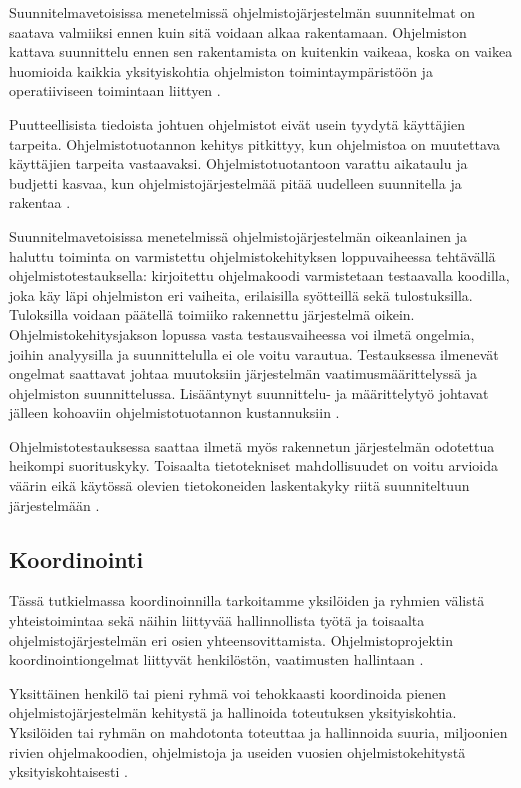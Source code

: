 \documentclass[finnish]{tktltiki2}
\theoremstyle{definition}
\theoremstyle{remark}
\begin{document}
Suunnitelmavetoisissa menetelmissä ohjelmistojärjestelmän suunnitelmat on saatava valmiiksi ennen kuin sitä voidaan alkaa rakentamaan. Ohjelmiston kattava suunnittelu ennen sen rakentamista on kuitenkin vaikeaa, koska on vaikea huomioida kaikkia yksityiskohtia ohjelmiston toimintaympäristöön ja operatiiviseen toimintaan liittyen \cite{BOE88}.

Puutteellisista tiedoista johtuen ohjelmistot eivät usein tyydytä käyttäjien tarpeita. Ohjelmistotuotannon kehitys pitkittyy, kun ohjelmistoa on muutettava käyttäjien tarpeita vastaavaksi. Ohjelmistotuotantoon varattu aikataulu ja budjetti kasvaa, kun ohjelmistojärjestelmää pitää uudelleen suunnitella ja rakentaa \cite{BEC99}.

Suunnitelmavetoisissa menetelmissä ohjelmistojärjestelmän oikeanlainen ja haluttu toiminta on varmistettu ohjelmistokehityksen loppuvaiheessa tehtävällä ohjelmistotestauksella: kirjoitettu ohjelmakoodi varmistetaan testaavalla koodilla, joka käy läpi ohjelmiston eri vaiheita, erilaisilla syötteillä sekä tulostuksilla. Tuloksilla voidaan päätellä toimiiko rakennettu järjestelmä oikein. Ohjelmistokehitysjakson lopussa vasta testausvaiheessa voi ilmetä ongelmia, joihin analyysilla ja suunnittelulla ei ole voitu varautua. Testauksessa ilmenevät ongelmat saattavat johtaa muutoksiin järjestelmän vaatimusmäärittelyssä ja ohjelmiston suunnittelussa. Lisääntynyt suunnittelu- ja määrittelytyö johtavat jälleen kohoaviin ohjelmistotuotannon kustannuksiin \cite{ROY70}.

Ohjelmistotestauksessa saattaa ilmetä myös rakennetun järjestelmän odotettua heikompi suorituskyky. Toisaalta tietotekniset mahdollisuudet on voitu arvioida väärin eikä käytössä olevien tietokoneiden laskentakyky riitä suunniteltuun järjestelmään \cite{BOE88}.
　
\subsection{Koordinointi}

Tässä tutkielmassa koordinoinnilla tarkoitamme yksilöiden ja ryhmien välistä yhteistoimintaa sekä näihin liittyvää hallinnollista työtä ja toisaalta ohjelmistojärjestelmän eri osien yhteensovittamista. Ohjelmistoprojektin koordinointiongelmat liittyvät henkilöstön, vaatimusten hallintaan \cite{KES95}.

Yksittäinen henkilö tai pieni ryhmä voi tehokkaasti koordinoida pienen ohjelmistojärjestelmän kehitystä ja hallinoida toteutuksen yksityiskohtia. Yksilöiden tai ryhmän on mahdotonta toteuttaa ja hallinnoida suuria, miljoonien rivien ohjelmakoodien, ohjelmistoja ja useiden vuosien ohjelmistokehitystä yksityiskohtaisesti \cite{KES95}.
\end{document}
